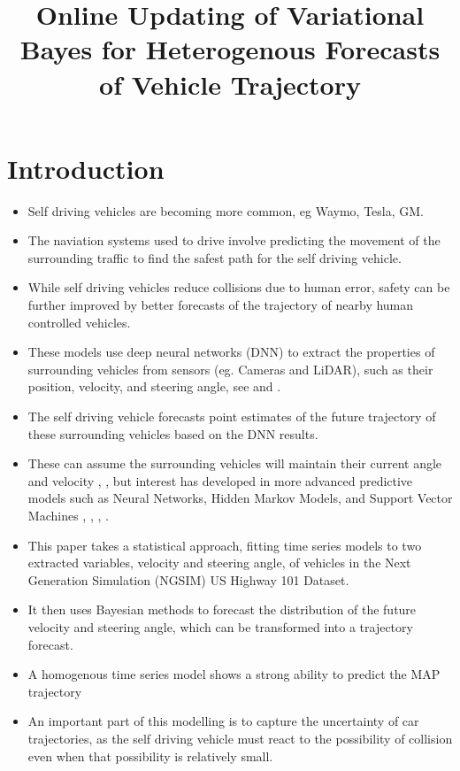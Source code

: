 \documentclass[12pt,a4paper]{article}\usepackage[]{graphicx}\usepackage[]{color}
\title{Online Updating of Variational Bayes for Heterogenous Forecasts of Vehicle Trajectory}
\begin{document}
\maketitle



\section{Introduction}
\label{sec:intro}

\begin{itemize}
\item Self driving vehicles are becoming more common, eg Waymo, Tesla, GM.
\item The naviation systems used to drive involve predicting the movement of the surrounding traffic to find the safest path for the self driving vehicle.
\item While self driving vehicles reduce collisions due to human error, safety can be further improved by better forecasts of the trajectory of nearby human controlled vehicles.
\item These models use deep neural networks (DNN) to extract the properties of surrounding vehicles from sensors (eg. Cameras and LiDAR), such as their position, velocity, and steering angle, see \citet{Woo2016a} and \citet{Tian2017}.
\item The self driving vehicle forecasts point estimates of the future trajectory of these surrounding vehicles based on the DNN results.
\item These can assume the surrounding vehicles will maintain their current angle and velocity \citet{Gindele2010}
\citet{Waymo2017}, \citet{Bautista2017}, but interest has developed in more advanced predictive models such as Neural Networks, Hidden Markov Models, and Support Vector Machines \citet{Woo2016b}, \citet{Ding2013}, \citet{Woo2017}, \citet{Geng2017}.
\item This paper takes a statistical approach, fitting time series models to two extracted variables, velocity and steering angle, of vehicles in the Next Generation Simulation (NGSIM) US Highway 101 Dataset.
\item It then uses Bayesian methods to forecast the distribution of the future velocity and steering angle, which can be transformed into a trajectory forecast.
\item A homogenous time series model shows a strong ability to predict the MAP trajectory
\item An important part of this modelling is to capture the uncertainty of car trajectories, as the self driving vehicle must react to the possibility of collision even when that possibility is relatively small.

\end{itemize}
\end{document}
